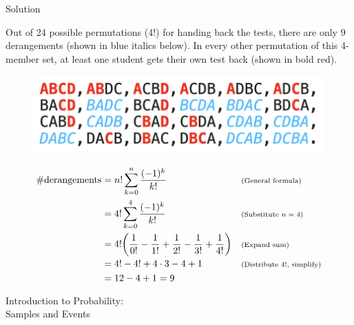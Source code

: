 \documentclass[10pt]{beamer}
\begin{document}
\begin{frame}{Solution}
\footnotesize 


\begin{myredbox}[title=Enumeration Solution]
 Out of 24 possible permutations (4!) for handing back the tests, there are only 9 derangements (shown in blue italics below). In every other permutation of this 4-member set, at least one student gets their own test back (shown in bold red).
 \begin{figure}
\includegraphics[width=.5\textwidth]{images/derangements.png}	
\end{figure}
\end{myredbox}
\vfill 
\pause 


\begin{mygreenbox}[title=Formulaic Solution]
\begin{align*}
\# \text{derangements} &= n! \sum_{k=0}^n \frac{(-1)^k}{k!} && \text{\scriptsize{{(General formula)}}} \\
&= 4! \sum_{k=0}^4 \frac{(-1)^k}{k!} && \text{\scriptsize{{(Substitute $n=4$)}}} \\
&= 4! \bigg(\frac{1}{0!} - \frac{1}{1!} + \frac{1}{2!} - \frac{1}{3!} + \frac{1}{4!} \bigg) && \text{\scriptsize{{(Expand sum)}}}  \\
&= 4! - 4! + 4 \cdot 3 - 4 + 1 && \text{\scriptsize{{(Distribute $4!$, simplify)}}} \\  
&= 12-4+1 = 9  
\end{align*}
\end{mygreenbox}


	

\end{frame}



\begin{frame}[standout]
Introduction to Probability: \\
Samples and Events
\end{frame}
\end{document}
